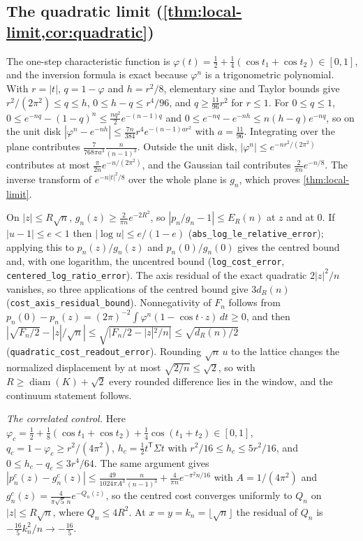 \documentclass[11pt]{article}
\newcommand{\lean}[1]{\nolinkurl{#1}}
\begin{document}
\subsection{The quadratic limit (\texorpdfstring{\cref{thm:local-limit,cor:quadratic}}{Theorem 8.1 and Corollary 8.2})}
\label{app:quadratic-proof}

The one-step characteristic function is $\varphi(t)=\tfrac12+\tfrac14(\cos t_1+\cos t_2)\in[0,1]$, and the inversion formula is exact because $\varphi^n$ is a trigonometric polynomial.
With $r=|t|$, $q=1-\varphi$ and $h=r^2/8$, elementary sine and Taylor bounds give $r^2/(2\pi^2)\le q\le h$, $0\le h-q\le r^4/96$, and $q\ge\tfrac{11}{96}r^2$ for $r\le1$.
For $0\le q\le1$, $0\le e^{-nq}-(1-q)^n\le\tfrac{n q^2}2e^{-(n-1)q}$ and $0\le e^{-nq}-e^{-nh}\le n(h-q)e^{-nq}$, so on the unit disk $|\varphi^n-e^{-nh}|\le\tfrac{7n}{384}r^4e^{-(n-1)ar^2}$ with $a=\tfrac{11}{96}$.
Integrating over the plane contributes $\tfrac{7}{768\pi a^3}\tfrac{n}{(n-1)^3}$.
Outside the unit disk, $|\varphi^n|\le e^{-nr^2/(2\pi^2)}$ contributes at most $\tfrac{\pi}{2n}e^{-n/(2\pi^2)}$, and the Gaussian tail contributes $\tfrac2{\pi n}e^{-n/8}$.
The inverse transform of $e^{-n|t|^2/8}$ over the whole plane is $g_n$, which proves \cref{thm:local-limit}.

On $|z|\le R\sqrt n$, $g_n(z)\ge\tfrac2{\pi n}e^{-2R^2}$, so $|p_n/g_n-1|\le E_R(n)$ at $z$ and at $0$.
If $|u-1|\le e<1$ then $|\log u|\le e/(1-e)$ (\lean{abs_log_le_relative_error}); applying this to $p_n(z)/g_n(z)$ and $p_n(0)/g_n(0)$ gives the centred bound and, with one logarithm, the uncentred bound (\lean{log_cost_error}, \lean{centered_log_ratio_error}).
The axis residual of the exact quadratic $2|z|^2/n$ vanishes, so three applications of the centred bound give $3d_R(n)$ (\lean{cost_axis_residual_bound}).
Nonnegativity of $F_n$ follows from $p_n(0)-p_n(z)=(2\pi)^{-2}\int\varphi^n(1-\cos t\cdot z)\,dt\ge0$, and then $|\sqrt{F_n/2}-|z|/\sqrt n|\le\sqrt{|F_n/2-|z|^2/n|}\le\sqrt{d_R(n)/2}$ (\lean{quadratic_cost_readout_error}).
Rounding $\sqrt n\,u$ to the lattice changes the normalized displacement by at most $\sqrt{2/n}\le\sqrt2$, so with $R\ge\operatorname{diam}(K)+\sqrt2$ every rounded difference lies in the window, and the continuum statement follows.

\emph{The correlated control.}
Here $\varphi_c=\tfrac12+\tfrac18(\cos t_1+\cos t_2)+\tfrac14\cos(t_1+t_2)\in[0,1]$, $q_c=1-\varphi_c\ge r^2/(4\pi^2)$, $h_c=\tfrac12t^{\mathsf T}\Sigma t$ with $r^2/16\le h_c\le5r^2/16$, and $0\le h_c-q_c\le3r^4/64$.
The same argument gives
$|p^c_n(z)-g^c_n(z)|\le\tfrac{49}{1024\pi A^3}\tfrac{n}{(n-1)^3}+\tfrac4{\pi n}e^{-\pi^2n/16}$ with $A=1/(4\pi^2)$ and $g^c_n(z)=\tfrac{4}{\pi\sqrt5\,n}e^{-Q_n(z)}$,
so the centred cost converges uniformly to $Q_n$ on $|z|\le R\sqrt n$, where $Q_n\le4R^2$.
At $x=y=k_n=\lfloor\sqrt n\rfloor$ the residual of $Q_n$ is $-\tfrac{16}5k_n^2/n\to-\tfrac{16}5$.
\end{document}
